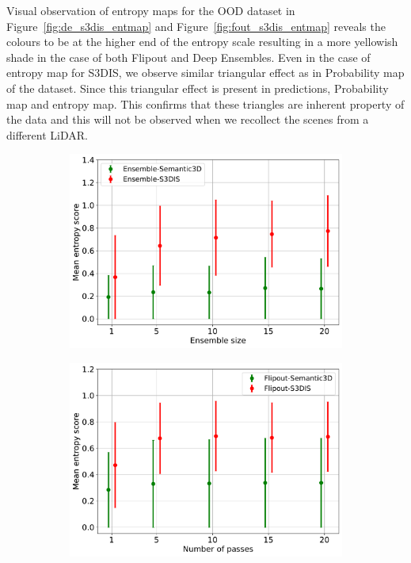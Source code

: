     Visual observation of entropy maps for the OOD dataset in Figure~\ref{fig:de_s3dis_entmap} and Figure~\ref{fig:fout_s3dis_entmap} reveals the colours to be at the higher end of the entropy scale resulting in a more yellowish shade in the case of both Flipout and Deep Ensembles.
    Even in the case of entropy map for S3DIS, we observe similar triangular effect as in Probability map of the dataset.
    Since this triangular effect is present in predictions, Probability map and entropy map.
    This confirms that these triangles are inherent property of the data and this will not be observed when we recollect the scenes from a different LiDAR.
    \begin{figure}[!ht]
        \begin{subfigure}{0.98\textwidth}
            \centering
        \includegraphics[scale=0.5]{images/MSP/Ensembles_ENT_semvs3d.pdf}
        \caption{}
        \label{fig:ent_ensembles}
        \end{subfigure}
        \begin{subfigure}{0.98\textwidth}
            \centering
        \includegraphics[scale=0.5]{images/MSP/Flipout_ENT_semvs3d.pdf}

\end{subfigure}
\end{figure}
